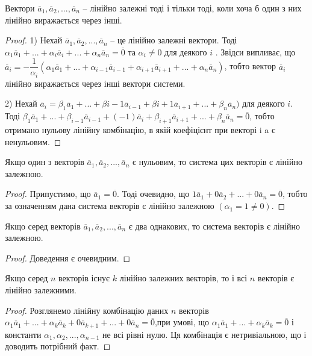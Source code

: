 \begin{claim}
	Вектори $\overline{a}_1, \overline{a}_2, ..., \overline{a}_n$ – лінійно залежні тоді і тільки тоді, коли хоча б
	один з них лінійно виражається через інші. 
\end{claim}
\begin{proof}
	1) Нехай $\overline{a}_1, \overline{a}_2, ..., \overline{a}_n$ -- це лінійно залежні вектори. Тоді
    $\alpha_1\overline{a}_1 + ... + \alpha_i\overline{a}_i + ... + \alpha_n\overline{a}_n = \overline{0}$ та $\alpha_i \neq 0$ для деякого $i$ . Звідси випливає, що
	$\overline{a}_i = -\dfrac{1}{\alpha_i}(\alpha_1\overline{a}_1 + ... + \alpha_{i-1}\overline{a}_{i-1} + \alpha_{i+1}\overline{a}_{i+1} + ... + \alpha_n\overline{a}_n)$, тобто вектор $\overline{a}_i$ лінійно
	виражається через інші вектори системи.
	
	2) Нехай $\overline{a}_i = \beta_1\overline{a}_1 + ... + \beta{i-1}\overline{a}_{i-1} + \beta{i+1}\overline{a}_{i+1} + ... + \beta_n\overline{a}_n)$ для деякого $i$. Тоді
	$\beta_1\overline{a}_1 + ... + \beta_{i-1}\overline{a}_{i-1} + (-1)\overline{a}_{i} + \beta_{i+1}\overline{a}_{i+1} + ... + \beta_{n}\overline{a}_{n} = \overline{0}$, тобто отримано нульову
	лінійну комбінацію, в якій коефіцієнт при векторі i a є ненульовим. 
\end{proof}

\begin{claim}
	Якщо один з векторів $\overline{a}_1, \overline{a}_2, ..., \overline{a}_n$ є нульовим, то система цих векторів
	є лінійно залежною. 
\end{claim}
\begin{proof}
	Припустимо, що $\overline{a}_1 = \overline{0}$. Тоді очевидно, що
	$1\overline{a}_1 + 0 \overline{a}_2 + ... + 0 \overline{a}_n = \overline{0}$, тобто за означенням дана система векторів є лінійно
	залежною $(\alpha_1 = 1 \neq 0)$. 
\end{proof}

\begin{claim}
	Якщо серед векторів $\overline{a}_1, \overline{a}_2, ..., \overline{a}_n$ є два однакових, то система векторів є
	лінійно залежною.
\end{claim}
\begin{proof}
	Доведення є очевидним.
\end{proof}

\begin{claim}
	Якщо серед $n$ векторів існує $k$ лінійно залежних векторів, то і всі $n$
	векторів є лінійно залежними.
\end{claim}
\begin{proof}
	Розглянемо лінійну комбінацію даних $n$ векторів
	$\alpha_1\overline{a}_1 + ... + \alpha_{k}\overline{a}_{k} + 0\overline{a}_{k+1} + ... + 0\overline{a}_{n} = \overline{0}$,при умові, що
	$\alpha_1\overline{a}_1 + ... + \alpha_{k}\overline{a}_{k} = \overline{0}$ і константи $\alpha_1, \alpha_2, ..., \alpha_{n-1}$ не всі рівні нулю. Ця
	комбінація є нетривіальною, що і доводить потрібний факт.
\end{proof}

